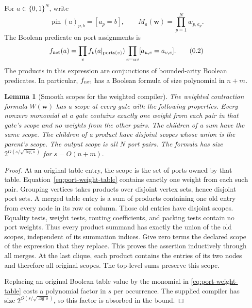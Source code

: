 \documentclass[11pt]{article}
\newtheorem{lemma}[theorem]{Lemma}
\theoremstyle{definition}
\theoremstyle{remark}
\begin{document}
For $a\in\{0,1\}^N$, write
\[
 \operatorname{pin}(a)_{p,b}=[a_p=b],
 \qquad
 M_a(\mathbf w)=\prod_{p=1}^N w_{p,a_p}.
\]
The Boolean predicate on port assignments is
\[
 f_{\rm net}(a)=
 \prod_v f_v(a|_{\operatorname{ports}(v)})
 \prod_{e=uv}[a_{u,e}=a_{v,e}].
 \tag{\thesection.2}\label{eq:port-predicate}
\]
The products in this expression are conjunctions of bounded-arity
Boolean predicates. In particular, $f_{\rm net}$ has a Boolean formula
of size polynomial in $n+m$.

\begin{lemma}[Smooth scopes for the weighted compiler]
\label{lem:port-smoothness}
The weighted contraction formula $W(\mathbf w)$ has a scope at every
gate with the following properties. Every nonzero monomial at a gate
contains exactly one weight from each pair in that gate's scope and
no weights from the other pairs. The children of a sum have the same
scope. The children of a product have disjoint scopes whose union is
the parent's scope. The output scope is all $N$ port pairs.
The formula has size $2^{O(s/\sqrt{\log s})}$ for $s=O(n+m)$.
\end{lemma}
\begin{proof}
At an original table entry, the scope is the set of ports owned by
that table. Equation~\eqref{eq:port-weight-table} contains exactly one
weight from each such pair. Grouping vertices takes products over
disjoint vertex sets, hence disjoint port sets. A merged table entry is
a sum of products containing one old entry from every node in its row
or column. Those old entries have disjoint scopes. Equality tests,
weight tests, routing coefficients, and packing tests contain no port
weights. Thus every product summand has exactly the union of the old
scopes, independent of its summation indices. Give zero terms the
declared scope of the expression that they replace. This proves the
assertion inductively through all merges. At the last clique, each
product contains the entries of its two nodes and therefore all
original scopes. The top-level sums preserve this scope.

Replacing an original Boolean table value by the monomial in
\eqref{eq:port-weight-table} costs a polynomial factor in $s$ per
occurrence. The supplied compiler has size
$2^{O(s/\sqrt{\log s})}$, so this factor is absorbed in the bound.
\end{proof}
\end{document}
